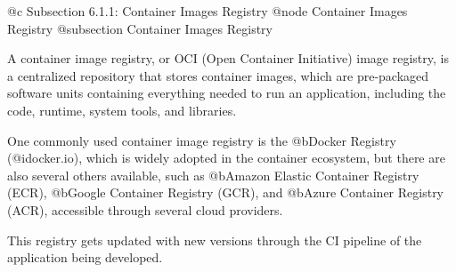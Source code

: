 @c Subsection 6.1.1: Container Images Registry
@node Container Images Registry
@subsection Container Images Registry

A container image registry, or OCI (Open Container Initiative) image registry, is a centralized repository that stores container images, which are pre-packaged software units containing everything needed to run an application, including the code, runtime, system tools, and libraries.

One commonly used container image registry is the @b{Docker Registry} (@i{docker.io}), which is widely adopted in the container ecosystem, but there are also several others available, such as @b{Amazon Elastic Container Registry (ECR)}, @b{Google Container Registry (GCR)}, and @b{Azure Container Registry (ACR)}, accessible through several cloud providers.

This registry gets updated with new versions through the CI pipeline of the application being developed.
